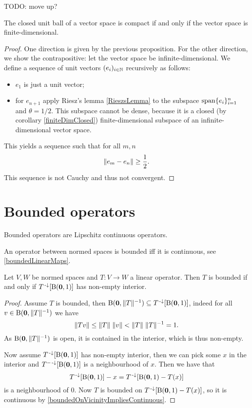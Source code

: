 TODO: move up?
\begin{proposition} \label{compactnessUnitBall}
The closed unit ball of a vector space is compact \textup{if and only if} the vector space is finite-dimensional.
\end{proposition}
\begin{proof}
One direction is given by the previous proposition. For the other direction, we show the contrapositive: let the vector space be infinite-dimensional.
We define a sequence of unit vectors $(e_i)_{i\in\mathbb{N}}$ recursively as follows:
\begin{itemize}
\item $e_1$ is just a unit vector;
\item for $e_{n+1}$ apply Riesz's lemma \ref{RieszsLemma} to the subspace $\operatorname{span}\{e_i\}_{i=1}^n$ and $\theta = 1/2$. This subspace cannot be dense, because it is a closed (by corollary \ref{finiteDimClosed}) finite-dimensional subspace of an infinite-dimensional vector space.
\end{itemize}
This yields a sequence such that for all $m,n$
\[ \lVert e_m - e_n\rVert\geq \frac{1}{2}. \]
This sequence is not Cauchy and thus not convergent.
\end{proof}





\section{Bounded operators}
Bounded operators are Lipschitz continuous operators.

An operator between normed spaces is bounded iff it is continuous, see \ref{boundedLinearMaps}.

\begin{lemma}
Let $V,W$ be normed spaces and $T:V\to W$ a linear operator. Then $T$ is bounded \textup{if and only if} $T^{{\text{\hspace{0.15em}-}\downarrow}}[\operatorname{B}(\boldsymbol{\mathrm{0}},1)]$ has non-empty interior.
\end{lemma}
\begin{proof}
Assume $T$ is bounded, then $\operatorname{B}(\boldsymbol{\mathrm{0}}, \lVert T\rVert^{-1}) \subseteq T^{{\text{\hspace{0.15em}-}\downarrow}}[\operatorname{B}(\boldsymbol{\mathrm{0}},1)]$, indeed for all $v\in \operatorname{B}(\boldsymbol{\mathrm{0}}, \lVert T\rVert^{-1})$ we have
\[ \lVert Tv\rVert \leq \lVert T\rVert\;\lVert v\rVert < \lVert T\rVert\;\lVert T\rVert^{-1} = 1.  \]
As $\operatorname{B}(\boldsymbol{\mathrm{0}}, \lVert T\rVert^{-1})$ is open, it is contained in the interior, which is thus non-empty.

Now assume $T^{{\text{\hspace{0.15em}-}\downarrow}}[\operatorname{B}(\boldsymbol{\mathrm{0}},1)]$ has non-empty interior, then we can pick some $x$ in the interior and $T^{-{\text{\hspace{0.15em}-}\downarrow}}[\operatorname{B}(\boldsymbol{\mathrm{0}},1)]$ is a neighbourhood of $x$. Then we have that
\[ T^{{\text{\hspace{0.15em}-}\downarrow}}[\operatorname{B}(\boldsymbol{\mathrm{0}},1)] - x = T^{{\text{\hspace{0.15em}-}\downarrow}}[\operatorname{B}(\boldsymbol{\mathrm{0}},1)- T(x)] \]
is a neighbourhood of $0$. Now $T$ is bounded on $T^{{\text{\hspace{0.15em}-}\downarrow}}[\operatorname{B}(\boldsymbol{\mathrm{0}},1)- T(x)]$, so it is continuous by \ref{boundedOnVicinityImpliesContinuous}.
\end{proof}


